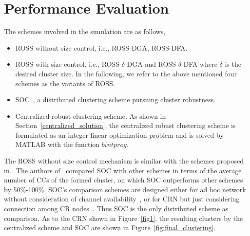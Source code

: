\documentclass[times]{ettauth}
\newcommand{\ie}{i.e., }
\theoremstyle{mytheoremstyle}
\theoremstyle{mytheoremstyle}
\theoremstyle{mytheoremstyle}
\begin{document}
\section{Performance Evaluation}
\label{performance}
The schemes involved in the simulation are as follows,
\begin{itemize}
\item ROSS without size control, \ie ROSS-DGA, ROSS-DFA.
\item ROSS with size control, \ie ROSS-$\delta$-DGA and ROSS-$\delta$-DFA where $\delta$ is the desired cluster size.
In the following, we refer to the above mentioned four schemes as the variants of ROSS.
\item SOC~\cite{LIU_TMC11_2}, a distributed clustering scheme pursuing cluster robustness.
\item Centralized robust clustering scheme. 
As shown in Section~\ref{centralized_solution}, the centralized robust clustering scheme is formulated as an integer linear optimization problem and is solved by MATLAB with the function $bintprog$.
\end{itemize}

The ROSS without size control mechanism is similar with the schemes proposed in \cite{Li11_ROSS}.
The authors of~\cite{LIU_TMC11_2} compared SOC with other schemes in terms of the average number of CCs of the formed cluster, on which SOC outperforms other schemes by 50\%-100\%. 
SOC's comparison schemes are designed either for ad hoc network without consideration of channel availability~\cite{Basagni99}, or for CRN but just considering connection among CR nodes~\cite{Zhao07}. 
Thus SOC is the only distributed scheme as comparison.
As to the CRN shown in Figure~\ref{fig1}, the resulting clusters by the centralized scheme and SOC are shown in Figure~\ref{fig:final_clustering}.
\end{document}
